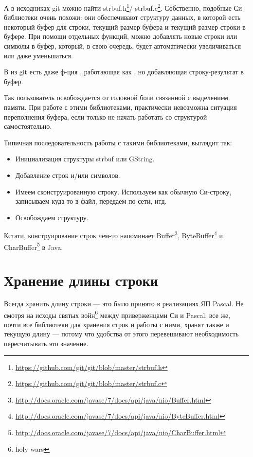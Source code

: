 \label{strbuf}
А в исходниках git можно найти strbuf.h\footnote{\url{https://github.com/git/git/blob/master/strbuf.h}}/
strbuf.c\footnote{\url{https://github.com/git/git/blob/master/strbuf.c}}. Собственно,
подобные Си-библиотеки очень похожи: они обеспечивают структуру данных, в которой есть некоторый буфер для строки, текущий размер буфера
и текущий размер строки в буфере. При помощи отдельных функций, можно добавлять новые строки или символы
в буфер, который, в свою очередь, будет автоматически увеличиваться или даже уменьшаться.

В  из git есть даже ф-ция , работающая как , 
но добавляющая строку-результат в буфер.

Так пользователь освобождается от головной боли связанной с выделением памяти.
При работе с этими библиотеками, практически невозможна ситуация переполнения буфера, если только не начать
работать со структурой самостоятельно.

Типичная последовательность работы с такими библиотеками, выглядит так:

\begin{itemize}
\item
Инициализация структуры strbuf или GString.

\item
Добавление строк и/или символов.

\item
Имеем сконструированную строку. Используем как обычную Си-строку, записываем куда-то в файл, передаем по сети, итд.

\item
Освобождаем структуру.
\end{itemize}

Кстати, конструирование строк чем-то напоминает 
Buffer\footnote{\url{http://docs.oracle.com/javase/7/docs/api/java/nio/Buffer.html}}, 
ByteBuffer\footnote{\url{http://docs.oracle.com/javase/7/docs/api/java/nio/ByteBuffer.html}} и 
CharBuffer\footnote{\url{http://docs.oracle.com/javase/7/docs/api/java/nio/CharBuffer.html}} в Java.

\section{Хранение длины строки}

Всегда хранить длину строки --- это было принято в реализациях ЯП Pascal. 
Не смотря на исходы святых войн\footnote{holy wars} между приверженцами Си и Pascal, все же, почти все библиотеки
для хранения строк и работы с ними, хранят также и текущую длину --- потому что удобства от этого перевешивают
необходимость пересчитывать это значение.

